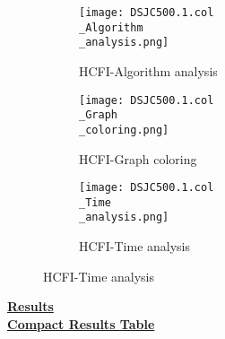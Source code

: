 \documentclass[10pt]{article}
\begin{document}
\graphicspath{{./Core1/Solutions/HCFI/DSJC500.1.col}}
\begin{figure}[H]
\begin{subfigure}{.33\textwidth}
  \centering
  \texttt{[image: DSJC500.1.col\\\_Algorithm\\\_analysis.png]}
  \caption{HCFI-Algorithm analysis}
   \label{fig:subfig1}
\end{subfigure}%
\begin{subfigure}{.33\textwidth}
  \centering
  \texttt{[image: DSJC500.1.col\\\_Graph\\\_coloring.png]}
  \caption{HCFI-Graph coloring}
  \label{fig:subfig2}
\end{subfigure}
\begin{subfigure}{.33\textwidth}
  \centering
  \texttt{[image: DSJC500.1.col\\\_Time\\\_analysis.png]}
  \caption{HCFI-Time analysis}
  \end{subfigure}
\end{figure}
\vspace{2cm}
\begin{center}
\hyperlink{page.8}{\textbf{Results}}\\
\vspace{0.5cm}
\hyperlink{page.71}{\textbf{Compact Results Table}}
\end{center}
\pagebreak
\end{document}
